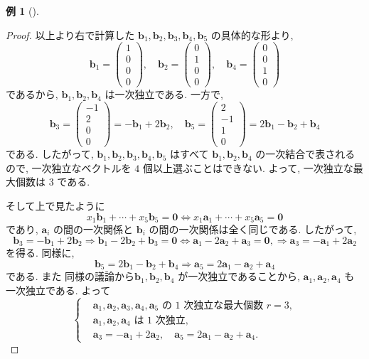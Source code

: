 \documentclass[dvipdfmx,a4paper,11pt]{article} %
\theoremstyle{definition}
\newtheorem{eg}[thm]{例}
\begin{document}
\begin{eg}[{\cite[例題4.3.1]{M}}]
\begin{proof}
以上より右で計算した $\bm{b}_1,\bm{b}_2,\bm{b}_3,\bm{b}_4,\bm{b}_5$ の具体的な形より, 
\[
\bm{b}_1=
\begin{pmatrix}
1\\0\\0\\0
\end{pmatrix},
\quad
\bm{b}_2=
\begin{pmatrix}
0\\1\\0\\0
\end{pmatrix},
\quad
\bm{b}_4=
\begin{pmatrix}
0\\0\\1\\0
\end{pmatrix}
\]
であるから, $\bm{b}_1,\bm{b}_2,\bm{b}_4$ は一次独立である.
一方で, 
\[
\bm{b}_3=
\begin{pmatrix}
-1\\2\\0\\0
\end{pmatrix}
=-\bm{b}_1+2\bm{b}_2,
\quad
\bm{b}_5=
\begin{pmatrix}
2\\-1\\1\\0
\end{pmatrix}
=2\bm{b}_1-\bm{b}_2+\bm{b}_4
\]
である. したがって, $\bm{b}_1,\bm{b}_2,\bm{b}_3,\bm{b}_4,\bm{b}_5$ はすべて $\bm{b}_1,\bm{b}_2,\bm{b}_4$ の一次結合で表されるので, 一次独立なベクトルを $4$ 個以上選ぶことはできない. よって, 一次独立な最大個数は $3$ である.

そして上で見たように
\[
x_1\bm{b}_1+\cdots+x_5\bm{b}_5=\bm{0}
\Longleftrightarrow
x_1\bm{a}_1+\cdots+x_5\bm{a}_5=\bm{0}
\]
であり, $\bm{a}_i$ の間の一次関係と $\bm{b}_i$ の間の一次関係は全く同じである. したがって, 
\[
\bm{b}_3=-\bm{b}_1+2\bm{b}_2
\Longrightarrow
\bm{b}_1-2\bm{b}_2+\bm{b}_3=\bm{0}
\Longleftrightarrow
\bm{a}_1-2\bm{a}_2+\bm{a}_3=\bm{0},
\Longrightarrow
\bm{a}_3=-\bm{a}_1+2\bm{a}_2
\]
を得る. 同様に, 
\[
\bm{b}_5=2\bm{b}_1-\bm{b}_2+\bm{b}_4
\Longrightarrow
\bm{a}_5=2\bm{a}_1-\bm{a}_2+\bm{a}_4
\]
である. 
また 同様の議論から$\bm{b}_1,\bm{b}_2,\bm{b}_4$ が一次独立であることから, $\bm{a}_1,\bm{a}_2,\bm{a}_4$ も一次独立である.
よって
\[
\left\{
\begin{aligned}
&\bm{a}_1,\bm{a}_2,\bm{a}_3,\bm{a}_4,\bm{a}_5\text{ の \(1\) 次独立な最大個数 }r=3,\\
&\bm{a}_1,\bm{a}_2,\bm{a}_4\text{ は \(1\) 次独立},\\
&\bm{a}_3=-\bm{a}_1+2\bm{a}_2,\quad \bm{a}_5=2\bm{a}_1-\bm{a}_2+\bm{a}_4.
\end{aligned}
\right.
\]
\end{proof}
\end{eg}
\end{document}
